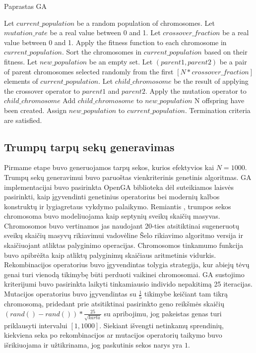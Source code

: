 \documentclass{VUMIFInfKursinis}
\begin{document}
\begin{algorithm}[H]
  \caption{Paprastas GA}\label{simple_GA}
  \begin{algorithmic}
    \State Let $current\_population$ be a random population of chromosomes.
    \State Let $mutation\_rate$ be a real value between 0 and 1.
    \State Let $crossover\_fraction$ be a real value between 0 and 1.
    \Repeat
      \State Apply the fitness function to each chromosome in $current\_population$.
      \State Sort the chromosomes in $current\_population$ based on their fitness. %
      \State Let $new\_population$ be an empty set.
      \Repeat
        \State Let $(parent1, parent2)$ be a pair of parent chromosomes selected randomly from the first $[N * crossover\_fraction]$ elements of $current\_population$.
        \State Let $child\_chromosome$ be the result of applying the crossover operator to $parent1$ and $parent2$.
          \State Apply the mutation operator to $child\_chromosome$
        \EndIf
        \State Add $child\_chromosome$ to $new\_population$
      \Until N offspring have been created.
      \State Assign $new\_population$ to $current\_population$.
    \Until Termination criteria are satisfied.
  \end{algorithmic}
\end{algorithm}

\subsection{Trumpų tarpų sekų generavimas}
Pirmame etape buvo generuojamos tarpų sekos, kurios efektyvios kai $N=1000$.
Trumpų sekų generavimui buvo paruoštas vienkriterinis genetinis algoritmas.
GA implementacijai buvo pasirinkta OpenGA biblioteka \cite{mohammadi2017openga}
dėl suteikiamos laisvės pasirinkti, kaip įgyvendinti genetinius operatorius bei modernių kalbos konstruktų ir lygiagretaus vykdymo palaikymo.
Remiantis \cite{simpson1999faster}, trumpos sekos chromosoma buvo modeliuojama kaip
septynių sveikų skaičių masyvas.
Chromosomos buvo vertinamos jas naudojant 20-ties atsitiktinai
sugeneruotų sveikų skaičių masyvų rikiavimui vadovėline Šelo rikiavimo algoritmo versija ir skaičiuojant atliktas palyginimo operacijas.
Chromosomos tinkamumo funkcija buvo apibrėžta kaip atliktų palyginimų skaičiaus aritmetinis vidurkis.
Rekombinacijos operatorius buvo įgyvendintas tolygia strategija, kur abiejų tėvų genai turi vienodą tikimybę
būti perduoti vaikinei chromosomai.
GA sustojimo kriterijumi buvo pasirinkta laikyti tinkamiausio individo nepakitimą 25 iteracijas.
Mutacijos operatorius buvo įgyvendintas su $\frac{1}{5}$ tikimybe keičiant tam tikrą chromosomą,
pridedant prie atsitiktinai pasirinkto geno reikšmės skaičių $(rand()-rand())*\frac{25}{\sqrt{karta}}$ su apribojimu, jog pakeistas genas turi priklausyti intervalui $[1, 1000]$.
Siekiant išvengti netinkamų sprendinių, kiekviena seka po rekombinacijos ar mutacijos operatorių taikymo buvo išrikiuojama ir
užtikrinama, jog paskutinis sekos narys yra $1$.
\end{document}
